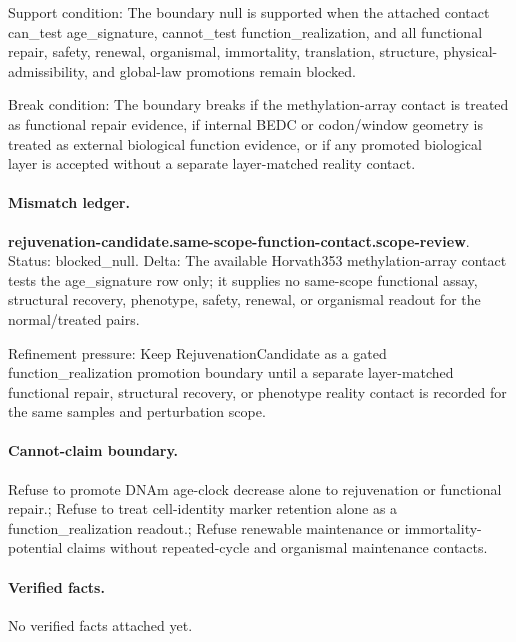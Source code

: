 Support condition: The boundary null is supported when the attached contact can\_test age\_signature, cannot\_test function\_realization, and all functional repair, safety, renewal, organismal, immortality, translation, structure, physical-admissibility, and global-law promotions remain blocked.

Break condition: The boundary breaks if the methylation-array contact is treated as functional repair evidence, if internal BEDC or codon/window geometry is treated as external biological function evidence, or if any promoted biological layer is accepted without a separate layer-matched reality contact.

\paragraph{Mismatch ledger.}
\textbf{rejuvenation-candidate.same-scope-function-contact.scope-review}. Status: blocked\_null. Delta: The available Horvath353 methylation-array contact tests the age\_signature row only; it supplies no same-scope functional assay, structural recovery, phenotype, safety, renewal, or organismal readout for the normal/treated pairs.

Refinement pressure: Keep RejuvenationCandidate as a gated function\_realization promotion boundary until a separate layer-matched functional repair, structural recovery, or phenotype reality contact is recorded for the same samples and perturbation scope.

\paragraph{Cannot-claim boundary.} Refuse to promote DNAm age-clock decrease alone to rejuvenation or functional repair.; Refuse to treat cell-identity marker retention alone as a function\_realization readout.; Refuse renewable maintenance or immortality-potential claims without repeated-cycle and organismal maintenance contacts.

\paragraph{Verified facts.}
No verified facts attached yet.
